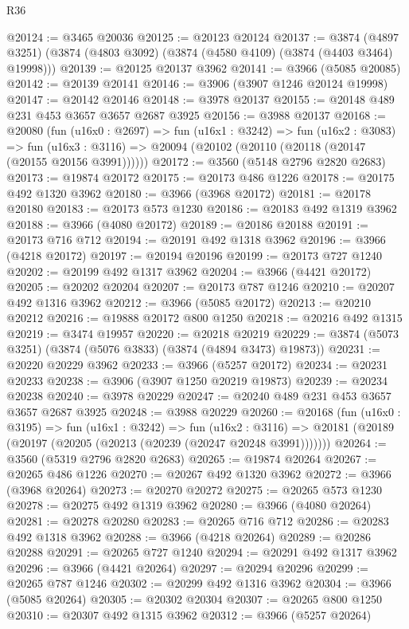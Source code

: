 \begin{lexlean}{R36}
\begin{coremodule}
@20124 := @3465 @20036
@20125 := @20123 @20124
@20137 := @3874
    (@4897 @3251)
    (@3874 (@4803 @3092) (@3874 (@4580 @4109) (@3874 (@4403 @3464) @19998)))
@20139 := @20125 @20137 @3962
@20141 := @3966 (@5085 @20085)
@20142 := @20139 @20141
@20146 := @3906 (@3907 @1246 @20124 @19998)
@20147 := @20142 @20146
@20148 := @3978 @20137
@20155 := @20148 @489 @231 @453 @3657 @3657 @2687 @3925
@20156 := @3988 @20137
@20168 := @20080
    (fun (u16x0 : @2697) =>
    fun (u16x1 : @3242) =>
    fun (u16x2 : @3083) =>
    fun (u16x3 : @3116) => @20094 (@20102 (@20110 (@20118 (@20147 (@20155 @20156 @3991))))))
@20172 := @3560 (@5148 @2796 @2820 @2683)
@20173 := @19874 @20172
@20175 := @20173 @486 @1226
@20178 := @20175 @492 @1320 @3962
@20180 := @3966 (@3968 @20172)
@20181 := @20178 @20180
@20183 := @20173 @573 @1230
@20186 := @20183 @492 @1319 @3962
@20188 := @3966 (@4080 @20172)
@20189 := @20186 @20188
@20191 := @20173 @716 @712
@20194 := @20191 @492 @1318 @3962
@20196 := @3966 (@4218 @20172)
@20197 := @20194 @20196
@20199 := @20173 @727 @1240
@20202 := @20199 @492 @1317 @3962
@20204 := @3966 (@4421 @20172)
@20205 := @20202 @20204
@20207 := @20173 @787 @1246
@20210 := @20207 @492 @1316 @3962
@20212 := @3966 (@5085 @20172)
@20213 := @20210 @20212
@20216 := @19888 @20172 @800 @1250
@20218 := @20216 @492 @1315
@20219 := @3474 @19957
@20220 := @20218 @20219
@20229 := @3874 (@5073 @3251) (@3874 (@5076 @3833) (@3874 (@4894 @3473) @19873))
@20231 := @20220 @20229 @3962
@20233 := @3966 (@5257 @20172)
@20234 := @20231 @20233
@20238 := @3906 (@3907 @1250 @20219 @19873)
@20239 := @20234 @20238
@20240 := @3978 @20229
@20247 := @20240 @489 @231 @453 @3657 @3657 @2687 @3925
@20248 := @3988 @20229
@20260 := @20168
    (fun (u16x0 : @3195) =>
    fun (u16x1 : @3242) =>
    fun (u16x2 : @3116) =>
    @20181 (@20189 (@20197 (@20205 (@20213 (@20239 (@20247 @20248 @3991)))))))
@20264 := @3560 (@5319 @2796 @2820 @2683)
@20265 := @19874 @20264
@20267 := @20265 @486 @1226
@20270 := @20267 @492 @1320 @3962
@20272 := @3966 (@3968 @20264)
@20273 := @20270 @20272
@20275 := @20265 @573 @1230
@20278 := @20275 @492 @1319 @3962
@20280 := @3966 (@4080 @20264)
@20281 := @20278 @20280
@20283 := @20265 @716 @712
@20286 := @20283 @492 @1318 @3962
@20288 := @3966 (@4218 @20264)
@20289 := @20286 @20288
@20291 := @20265 @727 @1240
@20294 := @20291 @492 @1317 @3962
@20296 := @3966 (@4421 @20264)
@20297 := @20294 @20296
@20299 := @20265 @787 @1246
@20302 := @20299 @492 @1316 @3962
@20304 := @3966 (@5085 @20264)
@20305 := @20302 @20304
@20307 := @20265 @800 @1250
@20310 := @20307 @492 @1315 @3962
@20312 := @3966 (@5257 @20264)

\end{coremodule}
\end{lexlean}

